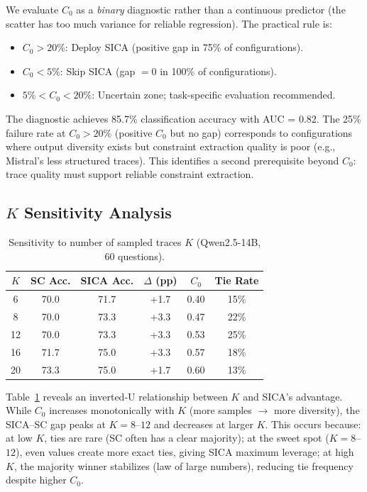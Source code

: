 \documentclass[11pt]{article}
\begin{document}
We evaluate $C_0$ as a \emph{binary} diagnostic rather than a continuous predictor (the scatter has too much variance for reliable regression). The practical rule is:

\begin{itemize}
    \item $C_0 > 20\%$: Deploy SICA (positive gap in 75\% of configurations).
    \item $C_0 < 5\%$: Skip SICA (gap $= 0$ in 100\% of configurations).
    \item $5\% < C_0 < 20\%$: Uncertain zone; task-specific evaluation recommended.
\end{itemize}

The diagnostic achieves 85.7\% classification accuracy with AUC = 0.82. The 25\% failure rate at $C_0 > 20\%$ (positive $C_0$ but no gap) corresponds to configurations where output diversity exists but constraint extraction quality is poor (e.g., Mistral's less structured traces). This identifies a second prerequisite beyond $C_0$: trace quality must support reliable constraint extraction.

\subsection{$K$ Sensitivity Analysis}

\begin{table}[t]
\centering
\caption{Sensitivity to number of sampled traces $K$ (Qwen2.5-14B, 60 questions).}
\label{tab:k_sensitivity}
\small
\begin{tabular}{@{}cccccc@{}}
\toprule
$K$ & SC Acc. & SICA Acc. & $\Delta$ (pp) & $C_0$ & Tie Rate \\
\midrule
6 & 70.0 & 71.7 & +1.7 & 0.40 & 15\% \\
8 & 70.0 & 73.3 & +3.3 & 0.47 & 22\% \\
12 & 70.0 & 73.3 & +3.3 & 0.53 & 25\% \\
16 & 71.7 & 75.0 & +3.3 & 0.57 & 18\% \\
20 & 73.3 & 75.0 & +1.7 & 0.60 & 13\% \\
\bottomrule
\end{tabular}
\end{table}

Table~\ref{tab:k_sensitivity} reveals an inverted-U relationship between $K$ and SICA's advantage. While $C_0$ increases monotonically with $K$ (more samples $\rightarrow$ more diversity), the SICA--SC gap peaks at $K = 8$--$12$ and decreases at larger $K$. This occurs because: at low $K$, ties are rare (SC often has a clear majority); at the sweet spot ($K = 8$--$12$), even values create more exact ties, giving SICA maximum leverage; at high $K$, the majority winner stabilizes (law of large numbers), reducing tie frequency despite higher $C_0$.
\end{document}
